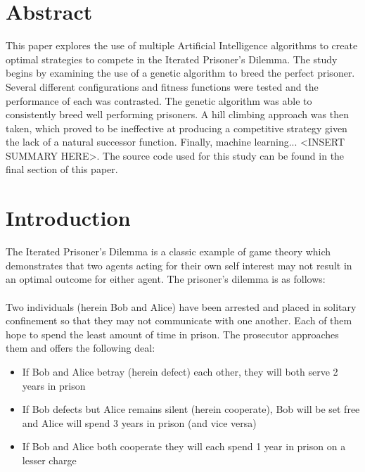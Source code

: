 \documentclass[12pt]{article}
\begin{document}
\maketitle

\pagebreak
\tableofcontents
\pagebreak

\section{Abstract}

This paper explores the use of multiple Artificial Intelligence algorithms to
create optimal strategies to compete in the Iterated Prisoner's Dilemma.  The
study begins by examining the use of a genetic algorithm to breed the perfect
prisoner.  Several different configurations and fitness functions were tested and
the performance of each was contrasted.  The genetic algorithm was able to
consistently breed well performing prisoners.
A hill climbing approach was then taken,
which proved to be ineffective at producing a competitive strategy given the
lack of a natural successor function. Finally, machine learning... <INSERT
SUMMARY HERE>.  The source code used for this study can be found in the final
section of this paper.

\pagebreak

\section{Introduction}
The Iterated Prisoner's Dilemma is a classic example of game theory which demonstrates
that two agents acting for their own self interest may not result in an
optimal outcome for either agent.  The prisoner's
dilemma is as follows: \\ \\
Two individuals (herein Bob and Alice) have been arrested and placed in solitary
confinement so that they may not communicate with one another.  Each of them hope
to spend the least amount of time in prison.  The prosecutor approaches them
and offers the following deal:
\begin{itemize}
    \item If Bob and Alice betray (herein defect) each other, they will
        both serve 2 years in prison
    \item If Bob defects but Alice remains silent (herein cooperate), Bob
        will be set free and Alice will spend 3 years in prison (and vice versa)
    \item If Bob and Alice both cooperate they will each spend 1 year in prison
        on a lesser charge \\
\end{itemize}
\end{document}
